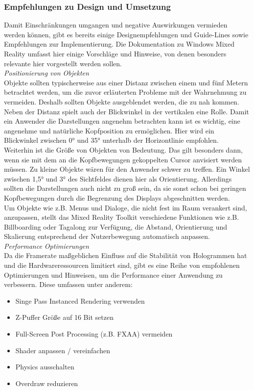 \subsubsection{Empfehlungen zu Design und Umsetzung}
\label{sec-2-1-5}
Damit Einschränkungen umgangen und negative Auswirkungen vermieden werden können, gibt es bereits einige Designempfehlungen und Guide-Lines sowie Empfehlungen zur Implementierung. Die Dokumentation zu Windows Mixed Reality umfasst hier einige Vorschläge und Hinweise, von denen besonders relevante hier vorgestellt werden sollen.\\

\textit{Positionierung von Objekten}\\
Objekte sollten typischerweise aus einer Distanz zwischen einem und fünf Metern betrachtet werden, um die zuvor erläuterten Probleme mit der Wahrnehmung zu vermeiden. Deshalb sollten Objekte ausgeblendet werden, die zu nah kommen. Neben der Distanz spielt auch der Blickwinkel in der vertikalen eine Rolle. Damit ein Anwender die Darstellungen angenehm betrachten kann ist es wichtig, eine angenehme und natürliche Kopfposition zu ermöglichen. Hier wird ein Blickwinkel zwischen 0° und 35° unterhalb der Horizontlinie empfohlen.\\

Weiterhin ist die Größe von Objekten von Bedeutung. Das gilt besonders dann, wenn sie mit dem an die Kopfbewegungen gekoppelten Cursor anvisiert werden müssen. Zu kleine Objekte wären für den Anwender schwer zu treffen. Ein Winkel zwischen 1,5° und 3° des Sichtfeldes dienen hier als Orientierung. Allerdings sollten die Darstellungen auch nicht zu groß sein, da sie sonst schon bei geringen Kopfbewegungen durch die Begrenzung des Displays abgeschnitten werden.\\

Um Objekte wie z.B. Menus und Dialoge, die nicht fest im Raum verankert sind, anzupassen, stellt das Mixed Reality Toolkit verschiedene Funktionen wie z.B. Billboarding oder Tagalong zur Verfügung, die Abstand, Orientierung und Skalierung entsprechend der Nutzerbewegung automatisch anpassen.\\

\textit{Performance Optimierungen}\\
Da die Framerate maßgeblichen Einfluss auf die Stabilität von Hologrammen hat und die Hardwareressourcen limitiert sind, gibt es eine Reihe von empfohlenen Optimierungen und Hinweisen, um die Performance einer Anwendung zu verbessern. Diese umfassen unter anderem:
\begin{itemize}[topsep=-2px]
	\setlength{\itemsep}{-1pt}
	\singlespacing
	\item Singe Pass Instanced Rendering verwenden
	\item Z-Puffer Größe auf 16 Bit setzen
	\item Full-Screen Post Processing (z.B. FXAA) vermeiden
	\item Shader anpassen / vereinfachen
	\item Physics ausschalten
	\item Overdraw reduzieren
\end{itemize}
\vspace{6px}

